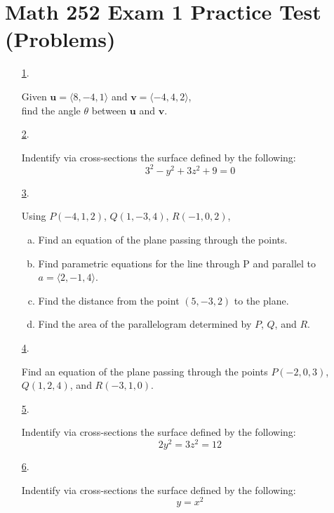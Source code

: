 \documentclass[fleqn]{article}
\renewcommand{\vec}[1]{\mathbf{#1}}
\begin{document}
\section*{Math 252 Exam 1 Practice Test (Problems)}
\begin{itemize}

\item[\hyperlink{1-answer}{1}.]\hypertarget{1-problem}{}

Given $\vec u=\langle 8,-4,1\rangle$ and $\vec v=\langle -4,4,2\rangle$,\\
find the angle $\theta$ between $\vec u$ and $\vec v$.
\smallskip

\item[\hyperlink{2-answer}{2}.]\hypertarget{2-problem}{}

Indentify via cross-sections the surface defined by the following:
$$ 3^2-y^2+3z^2+9=0 $$
\smallskip

\item[\hyperlink{3-answer}{3}.]\hypertarget{3-problem}{}

Using \(P(-4,1,2)\), \(Q(1,-3,4)\), \(R(-1,0,2)\),
\begin{enumerate}[a.]
  \item Find an equation of the plane passing through the points.
  \item Find parametric equations for the line through P and parallel to \(a=\langle 2,-1,4\rangle\).
  \item Find the distance from the point \((5,-3,2)\) to the plane.
  \item Find the area of the parallelogram determined by \(P\), \(Q\), and \(R\).
\end{enumerate}
\smallskip

\item[\hyperlink{4-answer}{4}.]\hypertarget{4-problem}{}

Find an equation of the plane passing through the points
$P(-2,0,3)$, $Q(1,2,4)$, and $R(-3,1,0)$.
\smallskip

\item[\hyperlink{5-answer}{5}.]\hypertarget{5-problem}{}

Indentify via cross-sections the surface defined by the following:
$$ 2y^2=3z^2=12 $$
\smallskip

\item[\hyperlink{6-answer}{6}.]\hypertarget{6-problem}{}

Indentify via cross-sections the surface defined by the following:
$$ y=x^2 $$
\smallskip


\end{itemize}
\end{document}
